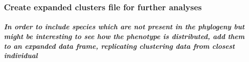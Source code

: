 \documentclass[
]{article}
\begin{document}
\hypertarget{create-expanded-clusters-file-for-further-analyses}{%
\subsubsection{Create expanded clusters file for further
analyses}\label{create-expanded-clusters-file-for-further-analyses}}

\hypertarget{in-order-to-include-species-which-are-not-present-in-the-phylogeny-but-might-be-interesting-to-see-how-the-phenotype-is-distributed-add-them-to-an-expanded-data-frame-replicating-clustering-data-from-closest-individual}{%
\subparagraph{In order to include species which are not present in the
phylogeny but might be interesting to see how the phenotype is
distributed, add them to an expanded data frame, replicating clustering
data from closest
individual}\label{in-order-to-include-species-which-are-not-present-in-the-phylogeny-but-might-be-interesting-to-see-how-the-phenotype-is-distributed-add-them-to-an-expanded-data-frame-replicating-clustering-data-from-closest-individual}}
\end{document}
